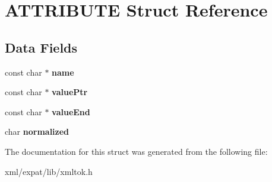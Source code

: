 \hypertarget{struct_a_t_t_r_i_b_u_t_e}{\section{A\-T\-T\-R\-I\-B\-U\-T\-E Struct Reference}
\label{struct_a_t_t_r_i_b_u_t_e}
}
\subsection*{Data Fields}
\begin{DoxyCompactItemize}
\item 
\hypertarget{struct_a_t_t_r_i_b_u_t_e_a93c42f62f5225db49d1c8fa995df0b98}{const char $\ast$ {\bfseries name}}\label{struct_a_t_t_r_i_b_u_t_e_a93c42f62f5225db49d1c8fa995df0b98}

\item 
\hypertarget{struct_a_t_t_r_i_b_u_t_e_aa74f5eb3f75d6a6e28fbf0c020bbe021}{const char $\ast$ {\bfseries value\-Ptr}}\label{struct_a_t_t_r_i_b_u_t_e_aa74f5eb3f75d6a6e28fbf0c020bbe021}

\item 
\hypertarget{struct_a_t_t_r_i_b_u_t_e_ad551901b9645e6abea66612eda5ac49e}{const char $\ast$ {\bfseries value\-End}}\label{struct_a_t_t_r_i_b_u_t_e_ad551901b9645e6abea66612eda5ac49e}

\item 
\hypertarget{struct_a_t_t_r_i_b_u_t_e_ab58ed5e3d2fd99385f6f7166ffead55a}{char {\bfseries normalized}}\label{struct_a_t_t_r_i_b_u_t_e_ab58ed5e3d2fd99385f6f7166ffead55a}

\end{DoxyCompactItemize}


The documentation for this struct was generated from the following file\-:\begin{DoxyCompactItemize}
\item 
xml/expat/lib/xmltok.\-h\end{DoxyCompactItemize}
